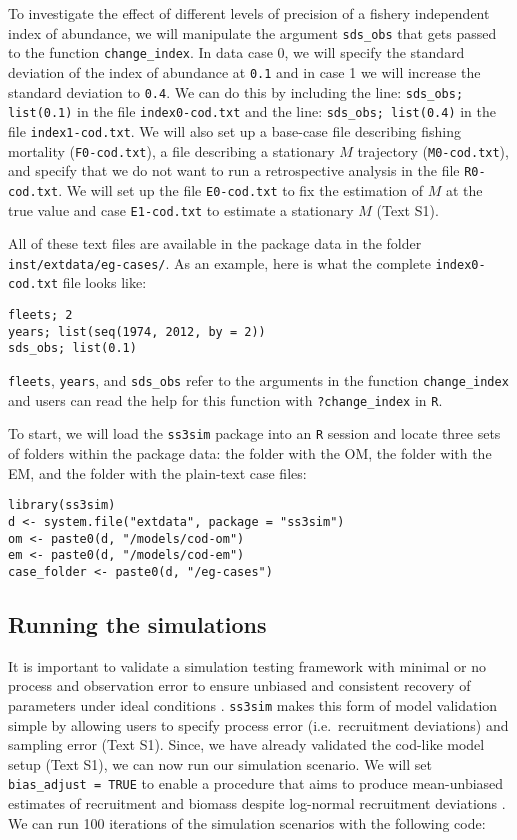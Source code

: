 \documentclass[11pt]{article}
\begin{document}
To investigate the effect of different levels of precision of a fishery independent index of abundance, we will manipulate the argument \texttt{sds\_obs} that gets passed to the function \texttt{change\_index}. In data case 0, we will specify the standard deviation of the index of abundance at \texttt{0.1} and in case 1 we will increase the standard deviation to \texttt{0.4}. We can do this by including the line: \texttt{sds\_obs; list(0.1)} in the file \texttt{index0-cod.txt} and the line: \texttt{sds\_obs; list(0.4)} in the file \texttt{index1-cod.txt}. We will also set up a base-case file describing fishing mortality (\texttt{F0-cod.txt}), a file describing a stationary $M$ trajectory (\texttt{M0-cod.txt}), and specify that we do not want to run a retrospective analysis in the file \texttt{R0-cod.txt}. We will set up the file \texttt{E0-cod.txt} to fix the estimation of $M$ at the true value and case \texttt{E1-cod.txt} to estimate a stationary $M$ (Text S1).

All of these text files are available in the package data in the folder \texttt{inst/extdata/eg-cases/}. As an example, here is what the complete \texttt{index0-cod.txt} file looks like:

\begin{verbatim}
fleets; 2
years; list(seq(1974, 2012, by = 2))
sds_obs; list(0.1)
\end{verbatim}

\noindent
\texttt{fleets}, \texttt{years}, and \texttt{sds\_obs} refer to the arguments in the function \texttt{change\_index} and users can read the help for this function with \texttt{?change\_index} in \texttt{R}.

To start, we will load the \texttt{ss3sim} package into an \texttt{R} session and locate three sets of folders within the package data: the folder with the OM, the folder with the EM, and the folder with the plain-text case files:

\begin{verbatim}
library(ss3sim)
d <- system.file("extdata", package = "ss3sim")
om <- paste0(d, "/models/cod-om")
em <- paste0(d, "/models/cod-em")
case_folder <- paste0(d, "/eg-cases")
\end{verbatim}

\subsection*{Running the simulations}

It is important to validate a simulation testing framework with minimal or no process and observation error to ensure unbiased and consistent recovery of parameters under ideal conditions \cite{hilborn1992, rykiel1996}. \texttt{ss3sim} makes this form of model validation simple by allowing users to specify process error (i.e.~recruitment deviations) and sampling error (Text S1). Since, we have already validated the cod-like model setup (Text S1), we can now run our simulation scenario. We will set \texttt{bias\_adjust = TRUE} to enable a procedure that aims to produce mean-unbiased estimates of recruitment and biomass despite log-normal recruitment deviations \cite{methot2011}. We can run 100 iterations of the simulation scenarios with the following code:
\end{document}
